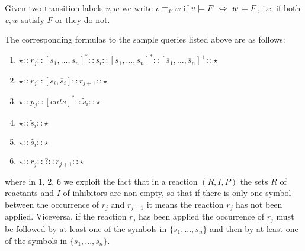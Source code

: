 Given two transition labels $v,w$ we write $v\equiv_F w$ if $v \models F\ \Leftrightarrow\ w \models F$, i.e. if both $v,w$ satisfy $F$ or they do not.


The corresponding formulas to the sample queries listed above are as follows:\\

\begin{enumerate}
\item
$\star :: r_j :: [ s_1,...,s_n ]^* :: s_i :: [  s_1,...,s_n ]^* :: [  \overline{s}_1,...,\overline{s}_n ]^+ :: \star$
\item
$\star :: r_j :: [s_i, \overline{s}_i] :: r_{j+1} :: \star$
\item
$\star :: p_j :: [  \mathit{ents} ]^* :: \tilde{s}_i :: \star$
\item
$\star :: \tilde{s}_i :: \star$
\item
$\star :: \hat{s}_i :: \star$
\item
$\star :: r_j :: ? :: r_{j+1} :: \star$
\end{enumerate}
where in 1, 2, 6 we exploit the fact that in a reaction $(R,I,P)$ the sets $R$ of reactants and  $I$ of inhibitors are non empty, so that if there is only one symbol between the occurrence of $r_j$ and $r_{j+1}$ it means the reaction $r_j$ has not been applied. Viceversa, if the reaction $r_j$ has been applied the occurrence of $r_j$ must be followed by at least one of the symbols in $\{s_1,...,s_n\}$ and then by at least one of the symbols in $\{\overline{s}_1,...,\overline{s}_n\}$.

